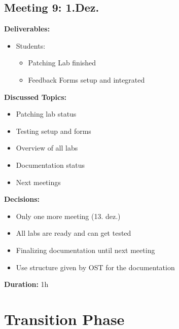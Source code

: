 \subsection*{Meeting 9: 1.Dez.}
\textbf{Deliverables:}
\begin{itemize}
    \item Students:
    \begin{itemize}
        \item Patching Lab finished 
        \item Feedback Forms setup and integrated
    \end{itemize}
\end{itemize} 
\textbf{Discussed Topics:}
\begin{itemize}
    \item Patching lab status 
    \item Testing setup and forms
    \item Overview of all labs
    \item Documentation status
    \item Next meetings
\end{itemize}
\textbf{Decisions:}
\begin{itemize}
    \item Only one more meeting (13. dez.)
    \item All labs are ready and can get tested
    \item Finalizing documentation until next meeting
    \item Use structure given by OST for the documentation
\end{itemize}
\textbf{Duration:} 1h

\newpage
\section*{Transition Phase}
